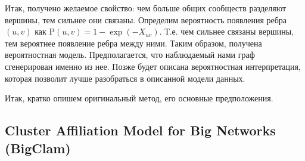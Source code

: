 \documentclass{ITaSconf}
\def\PP{\mathrm{P}}
\begin{document}
	Итак, получено желаемое свойство: чем больше общих сообществ разделяют вершины, тем сильнее они связаны. 
	Определим вероятность появления ребра $(u,v)$ как $\PP(u, v) = 1 - \exp ( - X_{uv})$. 
	Т.е. чем сильнее связаны вершины, тем вероятнее появление ребра между ними. 
	Таким образом, получена вероятностная модель. Предполагается, что наблюдаемый нами граф сгенерирован именно из нее.
	Позже будет описана вероятностная интерпретация, которая позволит лучше разобраться в описанной модели данных.
	
	Итак, кратко опишем оригинальный метод, его основные предположения.
	
	\subsection{Cluster Affiliation Model for Big Networks (BigClam)}
	
\end{document}
